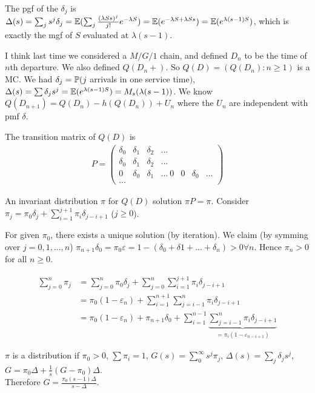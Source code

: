 \documentclass[a4paper]{article}
\begin{document}
The pgf of the $\delta_j$ is $\Delta(s) = \sum_j s^j \delta_j = \E(\sum_j \frac{(\lambda Ss)^j}{j!} e^{-\lambda S}) =\E (e^{-\lambda S + \lambda Ss}) =\E (e^{\lambda(s-1)S})$, which is exactly the mgf of $S$ evaluated at $\lambda(s-1)$.

I think last time we considered a $M/G/1$ chain, and defined $D_n$ to be the time of $n$th departure. We also defined $Q(D_n+)$. So $Q(D) = (Q(D_n):n \geq 1)$ is a MC. We had $\delta_j = \P(j$ arrivals in one service time$)$, $\Delta(s) = \sum \delta_j s^j = \E(e^{\lambda(s-1)S}) = M_s(\lambda(s-1))$. We know $Q(D_{n+1}) = Q(D_n) - h(Q(D_n)) + U_n$ where the $U_n$ are independent with pmf $\delta$.

The transition matrix of $Q(D)$ is 
\begin{equation*}
\begin{aligned}
P = \begin{pmatrix}
\delta_0 & \delta_1 & \delta_2 & ...\\
\delta_0 & \delta_1 & \delta_2 & ...\\
0 & \delta_0 & \delta_1 & ...\
0 & 0 & \delta_0 & ...\\
...
\end{pmatrix}
\end{aligned}
\end{equation*}

An invariant distribution $\pi$ for $Q(D)$ solution $\pi P = \pi$. Consider $\pi_j = \pi_0 \delta_j + \sum_{i=1}^{j+1} \pi_i \delta_{j-i+1}$ ($j \geq 0$).

For given $\pi_0$, there exists a unique solution (by iteration). We claim (by symming over $j=0,1,...,n$) $\pi_{n+1} \delta_0 = \pi_0 \varepsilon = 1-(\delta_0+\delta1+...+\delta_n) > 0 \forall n$. Hence $\pi_n > 0$ for all $n \geq 0$.

\begin{equation*}
\begin{aligned}
\sum_{j=0}^n \pi_j &= \sum_{j=0}^n \pi_0 \delta_j + \sum_{j = 0}^n \sum_{i=1}^{j+1} \pi_i \delta_{j-i+1}\\
&= \pi_0(1-\varepsilon_n) + \sum_{i=1}^{n+1} \sum_{j=i-1}^n \pi_i \delta_{j-i+1}\\
&= \pi_0(1-\varepsilon_n) + \pi_{n+1} \delta_0 + \sum_{i=1}^{n-1} \underbrace{\sum_{j=i-1}^n \pi_i \delta_{j-i+1}}_{=\pi_i (1-\varepsilon_{n-i+1})}
\end{aligned}
\end{equation*}


$\pi$ is a distribution if $\pi_0 > 0$, $\sum \pi_i = 1$, $G(s) = \sum_0^\infty s^j \pi_j$, $\Delta(s) = \sum_j \delta_j s^j$, $G= \pi_0 \Delta + \frac{1}{s}(G-\pi_0) \Delta$.\\
Therefore $G = \frac{\pi_0(s-1)\Delta}{s-\Delta}$.
\end{document}
